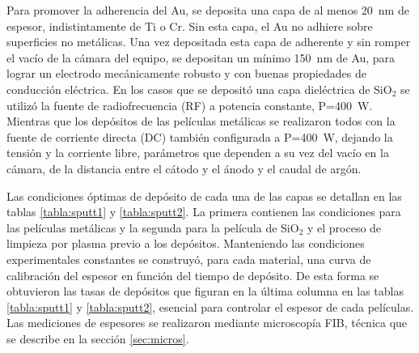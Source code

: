 			Para promover la adherencia del Au, se deposita una capa de al menos \SI{20}{\nm} de espesor, indistintamente de Ti o Cr. Sin esta capa, el Au no adhiere sobre superficies no metálicas\cite{Hieber1976}. Una vez depositada esta capa de adherente y sin romper el vacío de la cámara del equipo, se depositan un mínimo \SI{150}{\nm} de Au, para lograr un electrodo mecánicamente robusto y con buenas propiedades de conducción eléctrica. En los casos que se depositó una capa dieléctrica de SiO$_2$ se utilizó la fuente de radiofrecuencia (RF) a potencia constante, P=\SI{400}{W}. Mientras que los depósitos de las películas metálicas se realizaron todos con la fuente de corriente directa (DC) también configurada a P=\SI{400}{W}, dejando la tensión y la corriente libre, parámetros que dependen a su vez del vacío en la cámara, de la distancia entre el cátodo y el ánodo y el caudal de argón. 

			
			Las condiciones óptimas de depósito de cada una de las capas se detallan en las tablas \ref{tabla:sputt1} y \ref{tabla:sputt2}. La primera contienen las condiciones para las películas metálicas y la segunda para la película de SiO$_2$ y el proceso de limpieza por plasma previo a los depósitos. Manteniendo las condiciones experimentales constantes se construyó, para cada material, una curva de calibración del espesor en función del tiempo de depósito. De esta forma se obtuvieron las tasas de depósitos que figuran en la última columna en las tablas \ref{tabla:sputt1} y \ref{tabla:sputt2}, esencial para controlar el espesor de cada películas. Las mediciones de espesores se realizaron mediante microscopía FIB, técnica que se describe en la sección \ref{sec:micros}.

